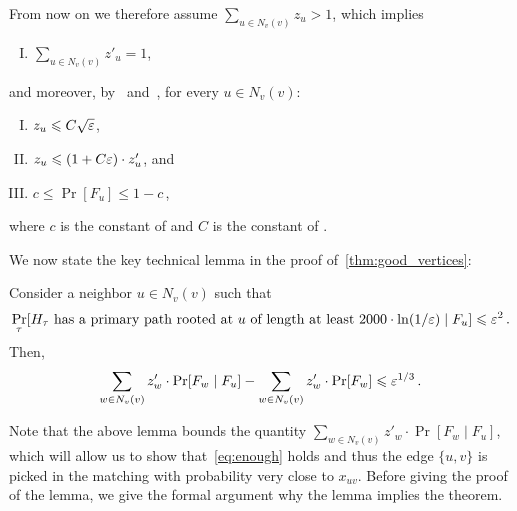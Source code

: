 From now on we therefore assume $\sum_{u\in N_v(v)} z_u >1$, which implies 
\begin{enumerate}[(I)]
\item $\sum_{u\in N_v(v)} z'_u = 1$,\label{en:d0}
\end{enumerate} 
and moreover, by~ and~, for every $u\in N_v(v)$:
\begin{enumerate}[(I)]
    \addtocounter{enumi}{1}
	\item $z_u \leqslant C \sqrt{\varepsilon}$, \label{en:d1}
	\item $z_u \leqslant (1+C\varepsilon) \cdot z'_u$, and \label{en:d2}
	\item $c \leq \Pr[F_u] \leq 1- c$\,, \label{en:d3}
\end{enumerate}
where $c$ is the constant of  and $C$ is the constant of . 

We now state the key technical lemma in the proof of~\cref{thm:good_vertices}: 
\begin{lem}	\label{lem:variance}
	Consider a neighbor $u\in N_v(v)$ such that 
	\begin{align}
	\Pr_{\tau}[\mbox{$H_\tau$  has a primary path rooted at $u$ of length at least $2000 \cdot \ln(1/\varepsilon)$} \mid F_u]\leqslant \varepsilon^2\,.
	\label{eq:key_lemma}
	\end{align}
	Then,
	\begin{align}
	\sum_{w\in N_v(v)} z'_w \cdot \Pr[F_w \mid F_u] - \sum_{w\in N_v(v)} z'_w  \cdot \Pr[F_w]    \leqslant \varepsilon^{1/3}\,.
	\label{eq:variance}
	\end{align}
\end{lem}
Note that the above lemma bounds the quantity $\sum_{w\in N_v(v)} z'_w \cdot \Pr[F_w \mid F_u]$, which will allow us to show that~\eqref{eq:enough} holds and thus the edge $\{u,v\}$ is picked in the matching with probability very close to $x_{uv}$. Before giving the proof of the lemma, we give the formal argument why the lemma implies the theorem.

